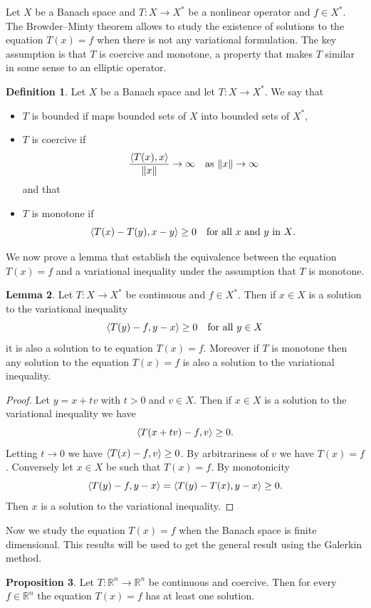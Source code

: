 \documentclass[a4paper,10pt,twoside]{amsbook}
\numberwithin{section}{chapter}
\numberwithin{equation}{chapter}
\theoremstyle{definition}
\newtheorem{prop}{Proposition}[chapter]
\newtheorem{defi}[prop]{Definition}
\newtheorem{lemma}[prop]{Lemma}
\DeclarePairedDelimiter{\norm}{\lVert}{\rVert}
\DeclarePairedDelimiter{\dual}{\langle}{\rangle}
\begin{document}
Let $X$ be a Banach space and $T\colon X\to X^*$ be a nonlinear operator and $f\in X^*$. The Browder--Minty theorem allows to study the existence of solutions to the equation $T(x)=f$ when there is not any variational formulation. The key assumption is that $T$ is coercive and monotone, a property that makes $T$ similar in some sense to an elliptic operator.
\begin{defi}
Let $X$ be a Banach space and let $T\colon X\to X^*$. We say that
\begin{itemize}
\item[(i)] $T$ is bounded if maps bounded sets of $X$ into bounded sets of $X^*$,
\item[(ii)] $T$ is coercive if
\[
\frac{\dual{T(x),x}}{\norm{x}}\to\infty\quad\text{as $\norm{x}\to\infty$}
\]
and that
\item[(iii)] $T$ is monotone if
\[
\dual{T(x)-T(y),x-y}\ge 0\quad\text{for all $x$ and $y$ in $X$}.
\]
\end{itemize}
\end{defi}
We now prove a lemma that establish the equivalence between the equation $T(x)=f$ and a variational inequality under the assumption that $T$ is monotone.
\begin{lemma}
\label{lemma:equality-inequality}
Let $T\colon X\to X^*$ be continuous and $f\in X^*$. Then if $x\in X$ is a solution to the variational inequality
\[
\dual{T(y)-f,y-x}\ge0\quad\text{for all $y\in X$}
\]
it is also a solution to te equation $T(x)=f$. Moreover if $T$ is monotone then any solution to the equation $T(x)=f$ is also a solution to the variational inequality.
\end{lemma}
\begin{proof}
Let $y=x+tv$ with $t>0$ and $v\in X$. Then if $x\in X$ is a solution to the variational inequality we have
\[
\dual{T(x+tv)-f,v}\ge 0.
\]
Letting $t\to0$ we have $\dual{T(x)-f,v}\ge0$. By arbitrariness of $v$ we have $T(x)=f$. Conversely let $x\in X$ be such that $T(x)=f$. By monotonicity
\[
\dual{T(y)-f,y-x}=\dual{T(y)-T(x),y-x}\ge 0.
\]
Then $x$ is a solution to the variational inequality.
\end{proof}
Now we study the equation $T(x)=f$ when the Banach space is finite dimensional. This results will be used to get the general result using the Galerkin method.
\begin{prop}
\label{prop:elliptic-finite-dimensional}
Let $T\colon\mathbb{R}^n\to\mathbb{R}^n$ be continuous and coercive. Then for every $f\in\mathbb{R}^n$ the equation $T(x)=f$ has at least one solution.
\end{prop}
\end{document}
